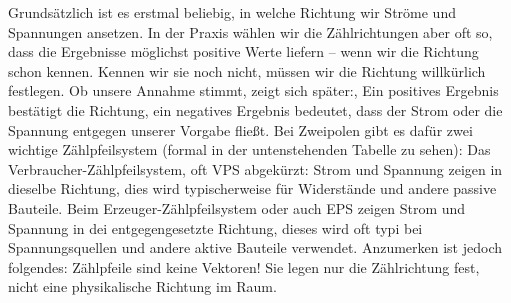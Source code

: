 \begin{frame}
{{			Grundsätzlich ist es erstmal beliebig, in welche Richtung wir Ströme und Spannungen ansetzen.
			In der Praxis wählen wir die Zählrichtungen aber oft so, dass die Ergebnisse möglichst positive Werte liefern – wenn wir die Richtung schon kennen.
			Kennen wir sie noch nicht, müssen wir die Richtung willkürlich festlegen.
			Ob unsere Annahme stimmt, zeigt sich später:,
			Ein positives Ergebnis bestätigt die Richtung,
			ein negatives Ergebnis bedeutet, dass der Strom oder die Spannung entgegen unserer Vorgabe fließt.
			Bei Zweipolen gibt es dafür zwei wichtige Zählpfeilsystem (formal in der untenstehenden Tabelle zu sehen):
			Das Verbraucher-Zählpfeilsystem, oft VPS abgekürzt: Strom und Spannung zeigen in dieselbe Richtung, dies wird typischerweise für Widerstände und andere passive Bauteile.
			Beim Erzeuger-Zählpfeilsystem oder auch EPS zeigen Strom und Spannung in dei entgegengesetzte Richtung, dieses wird oft typi bei Spannungsquellen und andere aktive Bauteile verwendet.
			Anzumerken ist jedoch folgendes:
			Zählpfeile sind keine Vektoren! Sie legen nur die Zählrichtung fest, nicht eine physikalische Richtung im Raum.
		}
		
		
	}
	
\end{frame}





%

